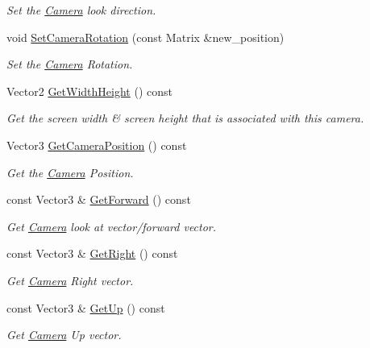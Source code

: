 \begin{DoxyCompactItemize}
\begin{DoxyCompactList}\small\item\em Set the \hyperlink{classCamera}{Camera} look direction. \end{DoxyCompactList}\item 
void \hyperlink{classCamera_a148acfe88ccb73ba5b658cd2e19ee244}{Set\+Camera\+Rotation} (const Matrix \&new\+\_\+position)
\begin{DoxyCompactList}\small\item\em Set the \hyperlink{classCamera}{Camera} Rotation. \end{DoxyCompactList}\item 
Vector2 \hyperlink{classCamera_a601c02931f32a0909bba512fb26a7b0c}{Get\+Width\+Height} () const
\begin{DoxyCompactList}\small\item\em Get the screen width \& screen height that is associated with this camera. \end{DoxyCompactList}\item 
Vector3 \hyperlink{classCamera_a9378bf4ae942a64e0bbda67a79e57922}{Get\+Camera\+Position} () const
\begin{DoxyCompactList}\small\item\em Get the \hyperlink{classCamera}{Camera} Position. \end{DoxyCompactList}\item 
const Vector3 \& \hyperlink{classCamera_a2b34df2f0303bac1ed652bc3186e5a98}{Get\+Forward} () const
\begin{DoxyCompactList}\small\item\em Get \hyperlink{classCamera}{Camera} look at vector/forward vector. \end{DoxyCompactList}\item 
const Vector3 \& \hyperlink{classCamera_afd3c91fa693b8a6fb74d2e4708f3aae2}{Get\+Right} () const
\begin{DoxyCompactList}\small\item\em Get \hyperlink{classCamera}{Camera} Right vector. \end{DoxyCompactList}\item 
const Vector3 \& \hyperlink{classCamera_a0d14fb92d976926e8fcec4409c1e2812}{Get\+Up} () const
\begin{DoxyCompactList}\small\item\em Get \hyperlink{classCamera}{Camera} Up vector. \end{DoxyCompactList}\item 
\mbox{\label{classCamera_aa46f58b32270a571ab56dde4caca46db}} 

\end{DoxyCompactItemize}
